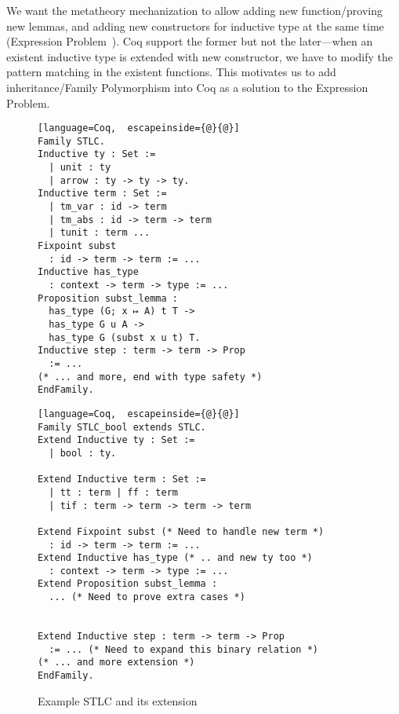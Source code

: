 
\newpage

We want the metatheory mechanization to allow adding new
function/proving new lemmas, and adding new constructors for inductive
type at the same time  (Expression Problem~\cite{wadler-ep}). Coq
support the former but not the later---when an existent inductive type
is extended with new constructor, we have to modify the pattern matching
in the existent functions. This motivates us to add inheritance/Family
Polymorphism into Coq as a solution to the Expression Problem. 

\begin{figure}[!htb]
  \begin{minipage}[t]{0.47\linewidth}
\begin{lstlisting}[language=Coq,  escapeinside={@}{@}]
Family STLC.
Inductive ty : Set :=
  | unit : ty
  | arrow : ty -> ty -> ty.
Inductive term : Set := 
  | tm_var : id -> term 
  | tm_abs : id -> term -> term 
  | tunit : term ...
Fixpoint subst 
  : id -> term -> term := ...
Inductive has_type 
  : context -> term -> type := ...
Proposition subst_lemma :
  has_type (G; x ↦ A) t T ->
  has_type G u A ->
  has_type G (subst x u t) T.
Inductive step : term -> term -> Prop 
  := ...
(* ... and more, end with type safety *)
EndFamily.
\end{lstlisting}
  \end{minipage}
  \begin{minipage}[t]{0.47\linewidth}
\begin{lstlisting}[language=Coq,  escapeinside={@}{@}]
Family STLC_bool extends STLC.
Extend Inductive ty : Set :=
  | bool : ty.

Extend Inductive term : Set := 
  | tt : term | ff : term 
  | tif : term -> term -> term -> term

Extend Fixpoint subst (* Need to handle new term *)
  : id -> term -> term := ...
Extend Inductive has_type (* .. and new ty too *)
  : context -> term -> type := ...
Extend Proposition subst_lemma :
  ... (* Need to prove extra cases *)


Extend Inductive step : term -> term -> Prop 
  := ... (* Need to expand this binary relation *)
(* ... and more extension *)
EndFamily.
\end{lstlisting}
  \end{minipage}
  \caption{Example STLC and its extension}\label{fig:STLC-example}
\end{figure}

